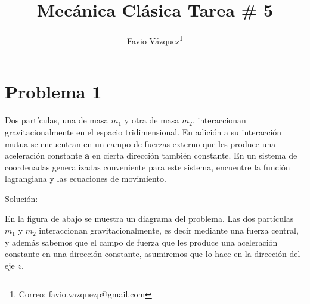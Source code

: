 \documentclass[a4paper,10pt]{article}
\title{Mecánica Clásica Tarea \# 5}
\author{Favio Vázquez\thanks{Correo: favio.vazquezp@gmail.com}}\affil{Instituto de Ciencias Nucleares. Universidad Nacional Autónoma de México.}
\date{}
\numberwithin{equation}{section}
\begin{document}
\makeatletter
\def\@maketitle{%
  \newpage
  \null
  \vskip 2em%
  \begin{center}%
  \let \footnote \thanks
    {\Large\bfseries \@title \par}%
    \vskip 1.5em%
    {\normalsize
      \lineskip .5em%
      \begin{tabular}[t]{c}%
        \@author
      \end{tabular}\par}%
    \vskip 1em%
    {\normalsize \@date}%
  \end{center}%
  \par
  \vskip 1.5em}
\makeatother

\maketitle

\section{Problema 1}

Dos partículas, una de masa $m_1$ y otra de masa $m_2$, interaccionan gravitacionalmente 
en el espacio tridimensional. En adición a su interacción mutua se encuentran en un campo 
de fuerzas externo que les produce una aceleración constante $\mathbf{a}$ en cierta 
dirección también constante. En un sistema de coordenadas generalizadas conveniente para este 
sistema, encuentre la función lagrangiana y las ecuaciones de movimiento.

\vspace{.3cm}

\underline{Solución:} \vspace{.3cm}

En la figura de abajo se muestra un diagrama del problema. Las dos partículas $m_1$ y 
$m_2$ interaccionan gravitacionalmente, es decir mediante una fuerza central, y además 
sabemos que el campo de fuerza que les produce una aceleración constante en 
una dirección constante, asumiremos que lo hace en la dirección del eje $z$.
\end{document}

